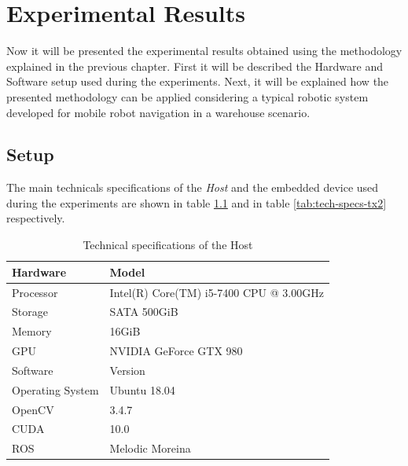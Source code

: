 \chapter{Experimental Results} \label{chap:experimental-results}
Now it will be presented the experimental results obtained using the methodology explained in the previous chapter.
First it will be described the Hardware and Software setup used during the experiments. Next, it will be explained how the presented methodology can be applied considering a typical robotic system developed for mobile robot navigation in a warehouse scenario.

\section{Setup}
The main technicals specifications of the \textit{Host} and the embedded device used during the experiments are shown in table \ref{tab:tech-specs-host} and in table \ref{tab:tech-specs-tx2} respectively. 

\begin{table}[htbp]
	\centering
	\begin{tabularx}{\linewidth}{|l|X|}
		\hline
		\rowcolor{Gray}
		Hardware         & Model                                   										   \\
		\hline
		Processor        & Intel(R) Core(TM) i5-7400 CPU @ 3.00GHz  \\
		Storage          & SATA 500GiB                             									 \\
		Memory           & 16GiB                                   											\\
		GPU              & NVIDIA GeForce GTX 980                  						   \\
		\hline
		\rowcolor{Gray}
		Software         & Version                                 											 \\
		\hline
		Operating System & Ubuntu 18.04		                       						   \\
		OpenCV           & 3.4.7                                  	 											\\
		CUDA             & 10.0                                    												   \\
		ROS              & Melodic Moreina                         									   \\
		\hline
	\end{tabularx}
	\caption{Technical specifications of the Host \label{tab:tech-specs-host}}
\end{table}


